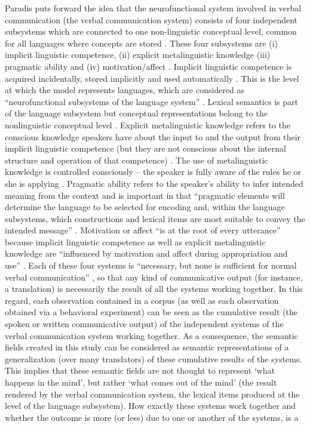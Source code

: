 Paradis puts forward the idea that the neurofunctional system involved in verbal communication (the verbal communication system) consists of four independent subsystems which are connected to one non-linguistic conceptual level, common for all languages where concepts are stored \citep[199]{kecskes_neurofunctional_2007}. These four subsystems are (i) implicit linguistic competence, (ii) explicit metalinguistic knowledge (iii) pragmatic ability and (iv) motivation/affect \citep[3]{paradis_neurolinguistic_2004, kecskes_neurofunctional_2007}. Implicit linguistic competence is acquired incidentally, stored implicitly and used automatically \citep[3-4]{kecskes_neurofunctional_2007}. This is the level at which the model represents languages, which are considered as “neurofunctional subsystems of the language system” \citep[225]{kecskes_neurofunctional_2007}. Lexical semantics is part of the language subsystem but conceptual representations belong to the nonlinguistic conceptual level \citep[199]{kecskes_neurofunctional_2007}. Explicit metalinguistic knowledge refers to the conscious knowledge speakers have about the input to and the output from their implicit linguistic competence (but they are not conscious about the internal structure and operation of that competence) \citep[4]{kecskes_neurofunctional_2007}. The use of metalinguistic knowledge is controlled consciously – the speaker is fully aware of the rules he or she is applying \citep[222]{paradis_neurolinguistic_2004}. Pragmatic ability refers to the speaker’s ability to infer intended meaning from the context \citep[4]{kecskes_neurofunctional_2007} and is important in that “pragmatic elements will determine the language to be selected for encoding and, within the language subsystems, which constructions and lexical items are most suitable to convey the intended message” \citep[222]{paradis_neurolinguistic_2004}. Motivation or affect “is at the root of every utterance” \citep[5]{kecskes_neurofunctional_2007} because implicit linguistic competence as well as explicit metalinguistic knowledge are “influenced by motivation and affect during appropriation and use” \citep[222]{paradis_neurolinguistic_2004}. Each of these four systems is “necessary, but none is sufficient for normal verbal communication” \citep[5]{kecskes_neurofunctional_2007}, so that any kind of communicative output (for instance, a translation) is necessarily the result of all the systems working together. In this regard, each observation contained in a corpus (as well as each observation obtained via a behavioral experiment) can be seen as the cumulative result (the spoken or written communicative output) of the independent systems of the verbal communication system working together. As a consequence, the semantic fields created in this study can be considered as semantic representations of a generalization (over many translators) of these cumulative results of the systems. This implies that these semantic fields are not thought to represent ‘what happens in the mind’, but rather ‘what comes out of the mind’ (the result rendered by the verbal communication system, the lexical items produced at the level of the language subsystem). How exactly these systems work together and whether the outcome is more (or less) due to one or another of the systems, is a 